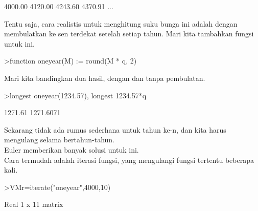 \documentclass[a4paper,10pt]{article}
\begin{document}
\begin{eulernotebook}
\begin{eulercomment}
\begin{eulercomment}
\begin{eulercomment}
\begin{eulercomment}
\begin{eulercomment}
\begin{eulercomment}
\begin{euleroutput}
      4000.00     4120.00     4243.60     4370.91     ...
\end{euleroutput}
\begin{eulercomment}
Tentu saja, cara realistis untuk menghitung suku bunga ini adalah
dengan membulatkan ke sen terdekat setelah setiap tahun. Mari kita
tambahkan fungsi untuk ini.
\end{eulercomment}
\begin{eulerprompt}
>function oneyear(M) := round(M * q, 2)
\end{eulerprompt}
\begin{eulercomment}
Mari kita bandingkan dua hasil, dengan dan tanpa pembulatan.
\end{eulercomment}
\begin{eulerprompt}
>longest oneyear(1234.57), longest 1234.57*q
\end{eulerprompt}
\begin{euleroutput}
                  1271.61 
                1271.6071 
\end{euleroutput}
\begin{eulercomment}
Sekarang tidak ada rumus sederhana untuk tahun ke-n, dan kita harus
mengulang selama bertahun-tahun.\\
Euler memberikan banyak solusi untuk ini.\\
Cara termudah adalah iterasi fungsi, yang mengulangi fungsi tertentu
beberapa kali.
\end{eulercomment}
\begin{eulerprompt}
>VMr=iterate("oneyear",4000,10)
\end{eulerprompt}
\begin{euleroutput}
  Real 1 x 11 matrix
  

\end{euleroutput}
\end{eulercomment}
\end{eulercomment}
\end{eulercomment}
\end{eulercomment}
\end{eulercomment}
\end{eulercomment}
\end{eulernotebook}
\end{document}

